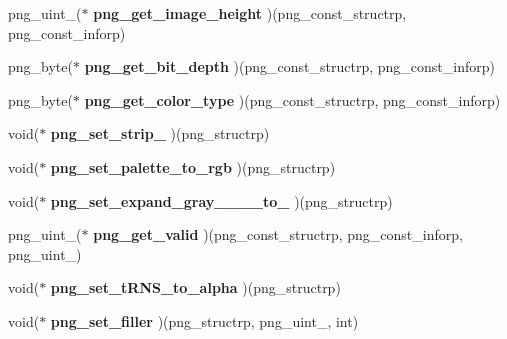\begin{DoxyCompactItemize}
png\+\_\+uint\+\_($\ast$ {\bfseries png\+\_\+get\+\_\+image\+\_\+height} )(png\+\_\+const\+\_\+structrp, png\+\_\+const\+\_\+inforp)
\item 
\mbox{\label{structlibpng__func__group_a840ac9c9ca26aa59e4ac49594cde4874}} 
png\+\_\+byte($\ast$ {\bfseries png\+\_\+get\+\_\+bit\+\_\+depth} )(png\+\_\+const\+\_\+structrp, png\+\_\+const\+\_\+inforp)
\item 
\mbox{\label{structlibpng__func__group_a4c714aca6c8fd45e0c49cba7f76d36bb}} 
png\+\_\+byte($\ast$ {\bfseries png\+\_\+get\+\_\+color\+\_\+type} )(png\+\_\+const\+\_\+structrp, png\+\_\+const\+\_\+inforp)
\item 
\mbox{\label{structlibpng__func__group_a8862d03c0f12da8b2f92f2dd939c196b}} 
void($\ast$ {\bfseries png\+\_\+set\+\_\+strip\+\_} )(png\+\_\+structrp)
\item 
\mbox{\label{structlibpng__func__group_a4f082ed2c166ba7e50fc21a4bd10d6af}} 
void($\ast$ {\bfseries png\+\_\+set\+\_\+palette\+\_\+to\+\_\+rgb} )(png\+\_\+structrp)
\item 
\mbox{\label{structlibpng__func__group_abd05f99dd4082b67a5ffc04fa503e9dc}} 
void($\ast$ {\bfseries png\+\_\+set\+\_\+expand\+\_\+gray\+\_\+\_\+\_\+\_\+to\+\_} )(png\+\_\+structrp)
\item 
\mbox{\label{structlibpng__func__group_a31963764a3aa8a7390c54a8ddd8bc331}} 
png\+\_\+uint\+\_($\ast$ {\bfseries png\+\_\+get\+\_\+valid} )(png\+\_\+const\+\_\+structrp, png\+\_\+const\+\_\+inforp, png\+\_\+uint\+\_)
\item 
\mbox{\label{structlibpng__func__group_a15f531dd051635c3416e0ebdfd2227b1}} 
void($\ast$ {\bfseries png\+\_\+set\+\_\+t\+R\+N\+S\+\_\+to\+\_\+alpha} )(png\+\_\+structrp)
\item 
\mbox{\label{structlibpng__func__group_a134d1cae820747fb0eb1e7574ecb1c07}} 
void($\ast$ {\bfseries png\+\_\+set\+\_\+filler} )(png\+\_\+structrp, png\+\_\+uint\+\_, int)
\item 

\end{DoxyCompactItemize}
